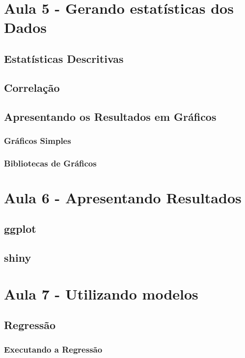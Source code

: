 \documentclass[12pt,a4paper,oneside]{erdc}
\begin{document}
\chapter{Aula 5 - Gerando estatísticas dos Dados}

\section{Estatísticas Descritivas}

\section{Correlação}

\section{Apresentando os Resultados em Gráficos}

\subsection{Gráficos Simples}

\subsection{Bibliotecas de Gráficos}

\chapter{Aula 6 - Apresentando Resultados}

\section{ggplot}

\section{shiny}

\chapter{Aula 7 - Utilizando modelos}

\section{Regressão}

\subsection{Executando a Regressão}
\end{document}
